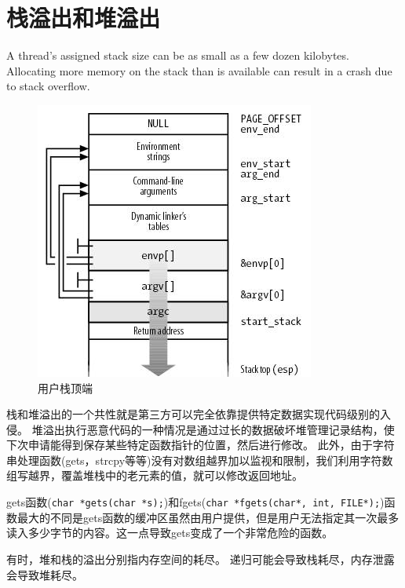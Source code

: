\section{栈溢出和堆溢出}

A thread's assigned stack size can be as small as a few dozen kilobytes. Allocating more memory on the stack than is available can result in a crash due to stack overflow.

\begin{figure}[ht]
	\begin{center}
		\includegraphics[keepaspectratio,width=0.3\paperwidth]{Pictures/LinuxUserStack.png}
	\caption{用户栈顶端}
	\label{fig:LinuxUserStack}
	\end{center}
\end{figure}

栈和堆溢出的一个共性就是第三方可以完全依靠提供特定数据实现代码级别的入侵。
堆溢出执行恶意代码的一种情况是通过过长的数据破坏堆管理记录结构，使下次申请能得到保存某些特定函数指针的位置，然后进行修改。
此外，由于字符串处理函数(gets，strcpy等等)没有对数组越界加以监视和限制，我们利用字符数组写越界，覆盖堆栈中的老元素的值，就可以修改返回地址。 

gets函数(\verb$char *gets(char *s);$)和fgets(\verb$char *fgets(char*, int, FILE*);$)函数最大的不同是gets函数的缓冲区虽然由用户提供，但是用户无法指定其一次最多读入多少字节的内容。这一点导致gets变成了一个非常危险的函数。

有时，堆和栈的溢出分别指内存空间的耗尽。
递归可能会导致栈耗尽，内存泄露会导致堆耗尽。
 
\clearpage